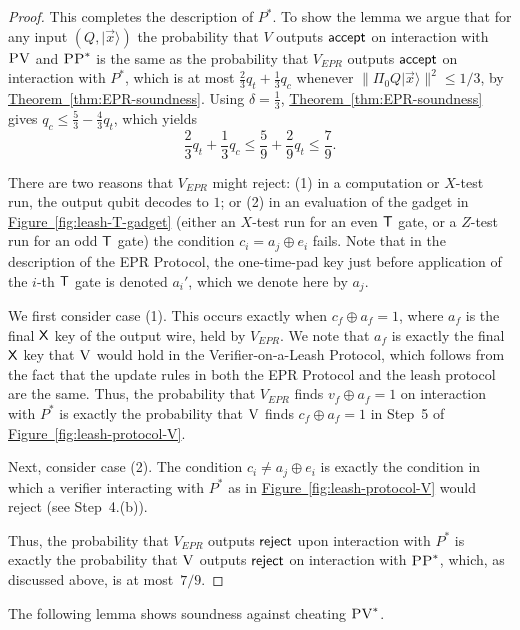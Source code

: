 \documentclass[11pt]{article}
\numberwithin{equation}{section}
\theoremstyle{definition}
\theoremstyle{plain}
\newcommand{\expref}[2]{\hyperref[#2]{#1~\ref{#2}}}
\newcommand{\ket}[1]{|#1\rangle}
\newcommand{\ver}{\textsc{V}}
\newcommand{\pv}{\textsc{PV}}
\newcommand{\pp}{\textsc{PP}}
\begin{document}
\begin{proof}
This completes the description of $P^*$. To show the lemma we argue that for any input $(Q,\ket{\vec{x}})$ the probability that $V$ outputs $\sf accept$ on interaction with $\pv$ and $\pp^*$ is the same as the probability that $V_{EPR}$ outputs $\sf accept$ on interaction with $P^*$, which is at most $\frac{2}{3}q_t+\frac{1}{3}q_c$ whenever $\|\Pi_0 Q \ket{\vec{x}}\|^2 \leq 1/3$, by \expref{Theorem}{thm:EPR-soundness}. Using $\delta=\frac{1}{3}$, \expref{Theorem}{thm:EPR-soundness} gives $q_c\leq \frac{5}{3}-\frac{4}{3}q_t$, which yields
$$\frac{2}{3}q_t+\frac{1}{3}q_c\leq \frac{5}{9}+\frac{2}{9}q_t\leq \frac{7}{9}.$$


There are two reasons that $V_{EPR}$ might reject: (1) in a computation or $X$-test run, the output qubit decodes to $1$; or (2) in an evaluation of the gadget in \expref{Figure}{fig:leash-T-gadget} (either an $X$-test run for an even $\sf T$ gate, or a $Z$-test run for an odd $\sf T$ gate) the condition ${c}_i=a_j\oplus e_i$ fails. Note that in the description of the EPR Protocol, the one-time-pad key just before application of the $i$-th $\sf T$ gate is denoted $a_i'$, which we denote here by $a_j$. 

We first consider case (1). This occurs exactly when ${c_f}\oplus a_f=1$, where $a_f$ is the final $\sf X$ key of the output wire, held by $V_{EPR}$. We note that $a_f$ is exactly the final $\sf X$ key that $\ver$ would hold in the Verifier-on-a-Leash Protocol, which follows from the fact that the update rules in both the EPR Protocol and the leash protocol are the same. Thus, the probability that $V_{EPR}$ finds ${v_f}\oplus a_f=1$ on interaction with $P^*$ is exactly the probability that $\ver$ finds $c_f\oplus a_f=1$ in Step~5 of \expref{Figure}{fig:leash-protocol-V}. 

Next, consider case (2). The condition ${c}_i\neq a_{j}\oplus e_i$ is exactly
 the condition in which a verifier interacting with $P^*$ as in \expref{Figure}{fig:leash-protocol-V} would reject (see Step~4.(b)).

Thus, the probability that $V_{EPR}$ outputs $\sf reject$ upon interaction with $P^*$ is exactly the probability that $\ver$ outputs $\sf reject$ on interaction with $\pp^*$, which, as discussed above, is at most~$7/9$. %
\end{proof}





\noindent The following lemma shows soundness against cheating $\pv^*$.
\end{document}
